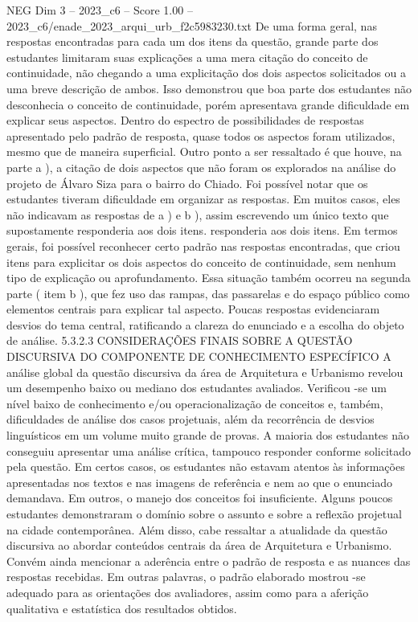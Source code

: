 \begin{textsample}{NEG Dim 3 – 2023\_c6 – Score 1.00 – 2023\_c6/enade\_2023\_arqui\_urb\_f2c5983230.txt}
De uma forma geral, nas respostas encontradas para cada um dos itens da questão, grande parte dos estudantes limitaram suas explicações a uma mera citação do conceito de continuidade, não chegando a uma explicitação dos dois aspectos solicitados ou a uma breve descrição de ambos.
Isso demonstrou que boa parte dos estudantes não desconhecia o conceito de continuidade, porém apresentava grande dificuldade em explicar seus aspectos.
Dentro do espectro de possibilidades de respostas apresentado pelo padrão de resposta, quase todos os aspectos foram utilizados, mesmo que de maneira superficial.
Outro ponto a ser ressaltado é que houve, na parte a ), a citação de dois aspectos que não foram os explorados na análise do projeto de Álvaro Siza para o bairro do Chiado.
Foi possível notar que os estudantes tiveram dificuldade em organizar as respostas.
Em muitos casos, eles não indicavam as respostas de a ) e b ), assim escrevendo um único texto que supostamente responderia aos dois itens. responderia aos dois itens.
Em termos gerais, foi possível reconhecer certo padrão nas respostas encontradas, que criou itens para explicitar os dois aspectos do conceito de continuidade, sem nenhum tipo de explicação ou aprofundamento.
Essa situação também ocorreu na segunda parte ( item b ), que fez uso das rampas, das passarelas e do espaço público como elementos centrais para explicar tal aspecto.
Poucas respostas evidenciaram desvios do tema central, ratificando a clareza do enunciado e a escolha do objeto de análise. 5.3.2.3 CONSIDERAÇÕES FINAIS SOBRE A QUESTÃO DISCURSIVA DO COMPONENTE DE CONHECIMENTO ESPECÍFICO A análise global da questão discursiva da área de Arquitetura e Urbanismo revelou um desempenho baixo ou mediano dos estudantes avaliados.
Verificou -se um nível baixo de conhecimento e/ou operacionalização de conceitos e, também, dificuldades de análise dos casos projetuais, além da recorrência de desvios linguísticos em um volume muito grande de provas.
A maioria dos estudantes não conseguiu apresentar uma análise crítica, tampouco responder conforme solicitado pela questão.
Em certos casos, os estudantes não estavam atentos às informações apresentadas nos textos e nas imagens de referência e nem ao que o enunciado demandava.
Em outros, o manejo dos conceitos foi insuficiente.
Alguns poucos estudantes demonstraram o domínio sobre o assunto e sobre a reflexão projetual na cidade contemporânea.
Além disso, cabe ressaltar a atualidade da questão discursiva ao abordar conteúdos centrais da área de Arquitetura e Urbanismo.
Convém ainda mencionar a aderência entre o padrão de resposta e as nuances das respostas recebidas.
Em outras palavras, o padrão elaborado mostrou -se adequado para as orientações dos avaliadores, assim como para a aferição qualitativa e estatística dos resultados obtidos.

\end{textsample}

